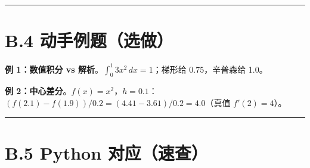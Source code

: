 \begin{center}\rule{0.5\linewidth}{0.5pt}\end{center}

\section{B.4
动手例题（选做）}\label{b.4-ux52a8ux624bux4f8bux9898ux9009ux505a}

\textbf{例 1：数值积分 vs 解析}。\(\int_0^1 3x^2\,dx=1\)；梯形给
0.75，辛普森给 1.0。

\textbf{例
2：中心差分}。\(f(x)=x^2\)，\(h=0.1\)：\((f(2.1)-f(1.9))/0.2=(4.41-3.61)/0.2=4.0\)（真值
\(f'(2)=4\)）。

\begin{Shaded}
\begin{Highlighting}[]
\OperatorTok{*}\OperatorTok{**}\NormalTok{, }\NormalTok{, }\NormalTok{)[}\NormalTok{])          }
\NormalTok{ x: (x[}\NormalTok{]}\OperatorTok{{-}}\NormalTok{)}\OperatorTok{**}\OperatorTok{=}\NormalTok{[}\NormalTok{]).x)  }
\OperatorTok{=}\NormalTok{ np.array([}\NormalTok{, }\NormalTok{, }\NormalTok{])}
\OperatorTok{*}\NormalTok{)[}\NormalTok{])                             }
\end{Highlighting}
\end{Shaded}

\begin{center}\rule{0.5\linewidth}{0.5pt}\end{center}

\section{B.5 Python
对应（速查）}\label{b.5-python-ux5bf9ux5e94ux901fux67e5}

